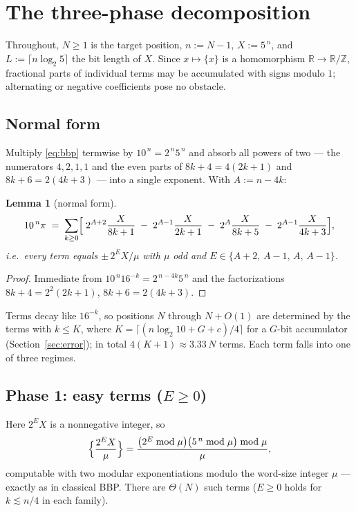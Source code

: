 \documentclass[11pt]{article}
\newtheorem{lemma}[theorem]{Lemma}
\theoremstyle{remark}
\theoremstyle{definition}
\newcommand{\frc}[1]{\{#1\}}
\begin{document}
\section{The three-phase decomposition}\label{sec:method}

Throughout, $N\ge 1$ is the target position, $n:=N-1$, $X:=5^{\,n}$, and
$L:=\lceil n\log_2 5\rceil$ the bit length of $X$. Since
$x\mapsto\frc{x}$ is a homomorphism $\mathbb{R}\to\mathbb{R}/\mathbb{Z}$,
fractional parts of individual terms may be accumulated with signs modulo
$1$; alternating or negative coefficients pose no obstacle.

\subsection{Normal form}

Multiply \eqref{eq:bbp} termwise by $10^{\,n}=2^{\,n}5^{\,n}$ and absorb all
powers of two --- the numerators $4,2,1,1$ and the even parts of
$8k+4=4(2k+1)$ and $8k+6=2(4k+3)$ --- into a single exponent. With
$A:=n-4k$:

\begin{lemma}[normal form]\label{lem:normal}
\begin{equation}\label{eq:normal}
10^{\,n}\pi \;=\; \sum_{k\ge 0}\Bigl[
\;2^{A+2}\frac{X}{8k+1}
\;-\;2^{A-1}\frac{X}{2k+1}
\;-\;2^{A}\frac{X}{8k+5}
\;-\;2^{A-1}\frac{X}{4k+3}\Bigr],
\end{equation}
i.e.\ every term equals $\pm\,2^{E} X/\mu$ with $\mu$ odd and
$E\in\{A+2,\,A-1,\,A,\,A-1\}$.
\end{lemma}

\begin{proof}
Immediate from $10^{\,n}16^{-k}=2^{\,n-4k}5^{\,n}$ and the factorizations
$8k+4=2^{2}(2k+1)$, $8k+6=2(4k+3)$.
\end{proof}

Terms decay like $16^{-k}$, so positions $N$ through $N+O(1)$ are determined
by the terms with $k\le K$, where
$K=\lceil (n\log_2 10 + G + c)/4\rceil$ for a $G$-bit accumulator
(Section~\ref{sec:error}); in total $4(K+1)\approx 3.33\,N$ terms. Each term
falls into one of three regimes.

\subsection{Phase 1: easy terms ($E\ge 0$)}

Here $2^{E}X$ is a nonnegative integer, so
\[
\Bigl\{\frac{2^{E}X}{\mu}\Bigr\}
=\frac{\bigl(2^{E}\bmod \mu\bigr)\bigl(5^{\,n}\bmod \mu\bigr)\bmod \mu}{\mu},
\]
computable with two modular exponentiations modulo the word-size integer
$\mu$ --- exactly as in classical BBP. There are $\Theta(N)$ such terms
($E\ge0$ holds for $k\lesssim n/4$ in each family).
\end{document}
